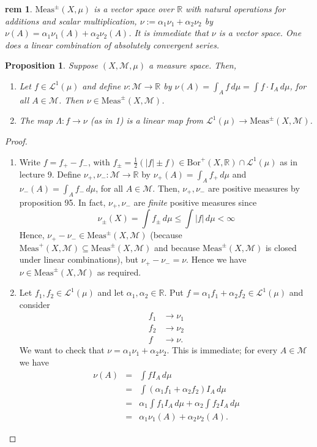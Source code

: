 \documentclass[letterpaper, 12pt]{article}
\newcommand{\fin}{\qquad \quad \hfill \framebox[1.75mm][l]{\,}}
\newcommand{\cL}{\mathcal{L}}
\newcommand{\cM}{\mathcal{M}}
\newcommand{\bR}{\mathbb{R}}
\newcommand{\Meas}{\mathrm{Meas}}
\newcommand{\Bor}{\mathrm{Bor}}
\theoremstyle{stdthm}
\newtheorem{prop}[thm]{Proposition}
\theoremstyle{stddef}
\newtheorem{rem}[thm]{rem} %
\theoremstyle{stdnonum}
\theoremstyle{stdqands}
\theoremstyle{stdbold}
\begin{document}
\begin{rem}
$\Meas^{\pm}(X,\mu)$ is a vector space over $\bR$ with natural operations for additions and scalar multiplication, $\nu:= \alpha_1\nu_1 + \alpha_2 \nu_2$ by $\nu(A) = \alpha_1\nu_1(A) + \alpha_2 \nu_2(A)$. It is immediate that $\nu$ is a vector space. One does a linear combination of absolutely convergent series. 
\end{rem}

\begin{prop}
Suppose $(X,\cM,\mu)$ a measure space. Then, 
\begin{enumerate}
\item Let $f \in \cL^1(\mu)$ and define $\nu: \cM \rightarrow \bR$ by $\nu(A) = \int_A f \, d\mu = \int f \cdot I_A \, d\mu$, for all $A \in \cM$. Then $\nu \in \Meas^{\pm}(X,\cM)$. 

\item The map $\Lambda: f \rightarrow \nu$ (as in 1) is a linear map from $\cL^1(\mu) \rightarrow \Meas^{\pm}(X,\cM)$. 
\end{enumerate}
\end{prop}

\begin{proof} $ $
\begin{enumerate}
\item Write $f = f_{+} - f_{-}$, with $f_{\pm} = \frac{1}{2} (|f| \pm f) \in \Bor^+(X,\bR) \cap \cL^1 (\mu)$ as in lecture 9. Define $\nu_+, \nu_{-}: \cM \rightarrow \bR$ by $\nu_+(A) = \int_A f_{+} \, d\mu$ and  $\nu_{-}(A) = \int_A f_{-} \, d\mu$, for all $A \in \cM$. Then, $\nu_+, \nu_-$ are positive measures by proposition 95. In fact, $\nu_+,\nu_-$ are \emph{finite} positive measures since
\[ \nu_{\pm} (X) = \int f_{\pm} \,d\mu \leq \int |f| \, d\mu < \infty  \]
Hence, $\nu_+ - \nu_- \in \Meas^{\pm}(X,\cM)$ (because $\Meas^+ (X,\cM) \subseteq \Meas^{\pm} (X,\cM)$ and because $\Meas^{\pm}(X,\cM)$ is closed under linear combinations), but $\nu_+ - \nu_- = \nu$. Hence we have $\nu \in \Meas^{\pm}(X,\cM)$ as required. 

\item Let $f_1,f_2 \in \cL^1(\mu)$ and let  $\alpha_1, \alpha_2 \in \bR$. Put $f = \alpha_1 f_1 + \alpha_2 f_2 \in \cL^1(\mu)$ and consider 
\begin{align*}
f_1 &\rightarrow \nu_1\\
f_2 & \rightarrow \nu_2\\
f & \rightarrow \nu.
\end{align*}
We want to check that $\nu = \alpha_1 \nu_1 + \alpha_2 \nu_2$. This is immediate; for every $A \in \cM$ we have 
\begin{eqnarray*}
\nu(A) &=& \int fI_A \, d\mu \\
&=& \int (\alpha_1f_1 + \alpha_2 f_2) I_A \, d\mu \\
&=& \alpha_1 \int f_1 I_{A} \, d\mu + \alpha_2 \int f_2 I_A \, d\mu \\
&=& \alpha_1 \nu_1(A) + \alpha_2 \nu_2(A).
\end{eqnarray*}
\end{enumerate}
\end{proof}
\end{document}
